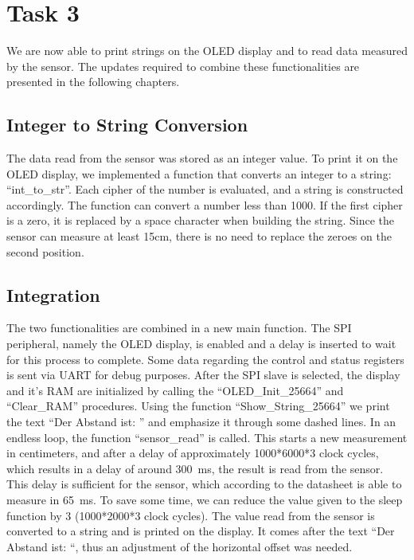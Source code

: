 	\section{Task 3} %
	\label{sec:impl_task_3}
		We are now able to print strings on the OLED display and to read data measured by the sensor. The updates required to combine these functionalities are presented in the following chapters.
		
		\subsection{Integer to String Conversion} %
		\label{sub:integer_to_string_conversion}
			The data read from the sensor was stored as an integer value. To print it on the OLED display, we implemented a function that converts an integer to a string: “int\_to\_str”. Each cipher of the number is evaluated, and a string is constructed accordingly. The function can convert a number less than 1000. If the first cipher is a zero, it is replaced by a space character when building the string. Since the sensor can measure at least 15cm, there is no need to replace the zeroes on the second position.  

		\subsection{Integration} %
		\label{sub:integration}
			The two functionalities are combined in a new main function. The SPI peripheral, namely the OLED display, is enabled and a delay is inserted to wait for this process to complete. Some data regarding the control and status registers is sent via UART for debug purposes. After the SPI slave is selected, the display and it’s RAM are initialized by calling the “OLED_Init_25664” and “Clear\_RAM” procedures. Using the function “Show\_String\_25664” we print the text “Der Abstand ist: ” and emphasize it through some dashed lines. 
			In an endless loop, the function “sensor\_read” is called. This starts a new measurement in centimeters, and after a delay of approximately 1000*6000*3 clock cycles, which results in a delay of around \SI{300}{\milli\second}, the result is read from the sensor. This delay is sufficient for the sensor, which according to the datasheet is able to measure in \SI{65}{\milli\second}. To save some time, we can reduce the value given to the sleep function by 3 (1000*2000*3 clock cycles). The value read from the sensor is converted to a string and is printed on the display. It comes after the text “Der Abstand ist: “, thus an adjustment of the horizontal offset was needed.

